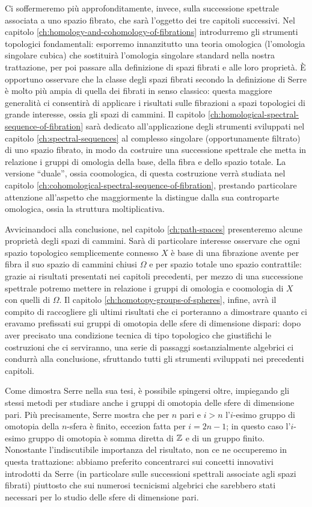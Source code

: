 Ci soffermeremo più approfonditamente, invece, sulla successione spettrale associata a uno spazio fibrato, che sarà l'oggetto dei tre capitoli successivi. Nel capitolo \ref{ch:homology-and-cohomology-of-fibrations} introdurremo gli strumenti topologici fondamentali: esporremo innanzitutto una teoria omologica (l'omologia singolare cubica) che sostituirà l'omologia singolare standard nella nostra trattazione, per poi passare alla definizione di spazi fibrati e alle loro proprietà. È opportuno osservare che la classe degli spazi fibrati secondo la definizione di Serre è molto più ampia di quella dei fibrati in senso classico: questa maggiore generalità ci consentirà di applicare i risultati sulle fibrazioni a spazi topologici di grande interesse, ossia gli spazi di cammini. Il capitolo \ref{ch:homological-spectral-sequence-of-fibration} sarà dedicato all'applicazione degli strumenti sviluppati nel capitolo \ref{ch:spectral-sequences} al complesso singolare (opportunamente filtrato) di uno spazio fibrato, in modo da costruire una successione spettrale che metta in relazione i gruppi di omologia della base, della fibra e dello spazio totale. La versione \enquote{duale}, ossia coomologica, di questa costruzione verrà studiata nel capitolo \ref{ch:cohomological-spectral-sequence-of-fibration}, prestando particolare attenzione all'aspetto che maggiormente la distingue dalla sua controparte omologica, ossia la struttura moltiplicativa.

Avvicinandoci alla conclusione, nel capitolo \ref{ch:path-spaces} presenteremo alcune proprietà degli spazi di cammini. Sarà di particolare interesse osservare che ogni spazio topologico semplicemente connesso \(X\) è base di una fibrazione avente per fibra il suo spazio di cammini chiusi \(\Omega\) e per spazio totale uno spazio contrattile: grazie ai risultati presentati nei capitoli precedenti, per mezzo di una successione spettrale potremo mettere in relazione i gruppi di omologia e coomologia di \(X\) con quelli di \(\Omega\). Il capitolo \ref{ch:homotopy-groups-of-spheres}, infine, avrà il compito di raccogliere gli ultimi risultati che ci porteranno a dimostrare quanto ci eravamo prefissati sui gruppi di omotopia delle sfere di dimensione dispari: dopo aver precisato una condizione tecnica di tipo topologico che giustifichi le costruzioni che ci serviranno, una serie di passaggi sostanzialmente algebrici ci condurrà alla conclusione, sfruttando tutti gli strumenti sviluppati nei precedenti capitoli.

Come dimostra Serre nella sua tesi, è possibile spingersi oltre, impiegando gli stessi metodi per studiare anche i gruppi di omotopia delle sfere di dimensione pari. Più precisamente, Serre mostra che per \(n\) pari e \(i>n\) l'\(i\)-esimo gruppo di omotopia della \(n\)-sfera è finito, eccezion fatta per \(i=2n-1\); in questo caso l'\(i\)-esimo gruppo di omotopia è somma diretta di \(\mathbb{Z}\) e di un gruppo finito. Nonostante l'indiscutibile importanza del risultato, non ce ne occuperemo in questa trattazione: abbiamo preferito concentrarci sui concetti innovativi introdotti da Serre (in particolare sulle successioni spettrali associate agli spazi fibrati) piuttosto che sui numerosi tecnicismi algebrici che sarebbero stati necessari per lo studio delle sfere di dimensione pari.
